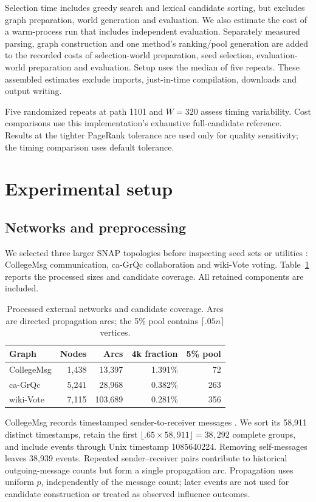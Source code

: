 \documentclass[smallextended]{svjour3}
\begin{document}
Selection time includes greedy search and lexical candidate sorting, but excludes graph preparation, world generation and evaluation. We also estimate the cost of a warm-process run that includes independent evaluation. Separately measured parsing, graph construction and one method's ranking/pool generation are added to the recorded costs of selection-world preparation, seed selection, evaluation-world preparation and evaluation. Setup uses the median of five repeats. These assembled estimates exclude imports, just-in-time compilation, downloads and output writing.

Five randomized repeats at path 1101 and $W=320$ assess timing variability. Cost comparisons use this implementation's exhaustive full-candidate reference. Results at the tighter PageRank tolerance are used only for quality sensitivity; the timing comparison uses default tolerance.

\section{Experimental setup}
\subsection{Networks and preprocessing}
We selected three larger SNAP topologies before inspecting seed sets or utilities \cite{snap}: CollegeMsg communication, ca-GrQc collaboration and wiki-Vote voting. Table~\ref{tab:data} reports the processed sizes and candidate coverage. All retained components are included.
\begin{table}[htbp]
\caption{Processed external networks and candidate coverage. Arcs are directed propagation arcs; the 5\% pool contains $\lceil .05n\rceil$ vertices.}\label{tab:data}
\begin{tabular}{lrrrr}
\toprule
Graph & Nodes & Arcs & 4k fraction & 5\% pool \\
\midrule
CollegeMsg & 1,438 & 13,397 & 1.391\% & 72 \\
ca-GrQc & 5,241 & 28,968 & 0.382\% & 263 \\
wiki-Vote & 7,115 & 103,689 & 0.281\% & 356 \\
\bottomrule
\end{tabular}
\end{table}

CollegeMsg records timestamped sender-to-receiver messages \cite{college}. We sort its 58,911 distinct timestamps, retain the first $\lfloor .65\times58,911\rfloor=38,292$ complete groups, and include events through Unix timestamp 1085640224. Removing self-messages leaves 38,939 events. Repeated sender--receiver pairs contribute to historical outgoing-message counts but form a single propagation arc. Propagation uses uniform $p$, independently of the message count; later events are not used for candidate construction or treated as observed influence outcomes.
\end{document}
